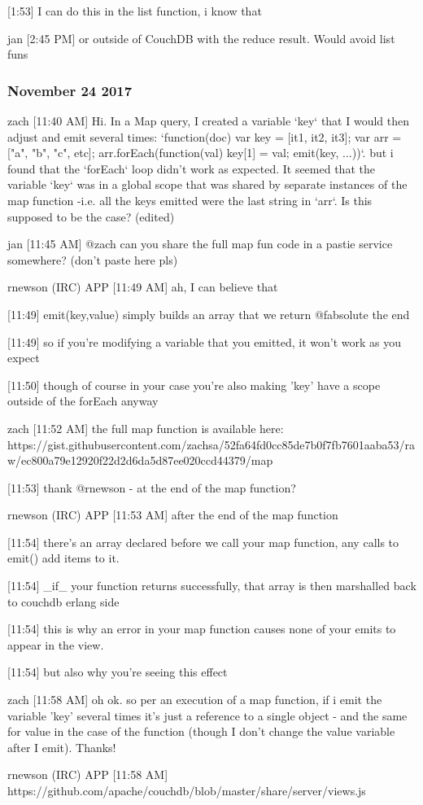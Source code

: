 [1:53]
I can do this in the list function, i know that

jan [2:45 PM]
or outside of CouchDB with the reduce result. Would avoid list funs

\subsubsection{November 24 2017}
\label{slack-24-nov}
zach [11:40 AM]
Hi. In a Map query, I created a variable `key` that I would then adjust and emit several times: `function(doc) {var key = [it1, it2, it3]; var arr = ["a", "b", "c", etc]; arr.forEach(function(val) {key[1] = val; emit(key, ...)})}`. but i found that the `forEach` loop didn't work as expected. It seemed that the variable `key` was in a global scope that was shared by separate instances of the map function -i.e. all the keys emitted were the last string in `arr`. Is this supposed to be the case? (edited)

jan [11:45 AM]
@zach can you share the full map fun code in a pastie service somewhere? (don’t paste here pls)

rnewson (IRC) APP [11:49 AM]
ah, I can believe that

    [11:49]
emit(key,value) simply builds an array that we return @fabsolute the end

    [11:49]
so if you're modifying a variable that you emitted, it won't work as you expect

    [11:50]
though of course in your case you're also making 'key' have a scope outside of the forEach anyway

zach [11:52 AM]
the full map function is available here: https://gist.githubusercontent.com/zachsa/52fa64fd0cc85de7b0f7fb7601aaba53/raw/ec800a79e12920f22d2d6da5d87ee020ccd44379/map%

[11:53]
thank @rnewson - at the end of the map function?

rnewson (IRC) APP [11:53 AM]
after the end of the map function

    [11:54]
there's an array declared before we call your map function, any calls to emit() add items to it.

[11:54]
\_if\_ your function returns successfully, that array is then marshalled back to couchdb erlang side

    [11:54]
this is why an error in your map function causes none of your emits to appear in the view.

[11:54]
but also why you're seeing this effect

zach [11:58 AM]
oh ok. so per an execution of a map function, if i emit the variable 'key' several times it's just a reference to a single object - and the same for value in the case of the function (though I don't change the value variable after I emit). Thanks!

rnewson (IRC) APP [11:58 AM]
https://github.com/apache/couchdb/blob/master/share/server/views.js